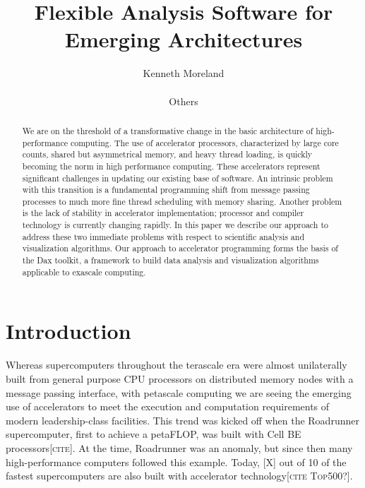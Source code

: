 \documentclass{sig-alternate}
\author{
  \alignauthor Kenneth Moreland \\
  \myaffaddr{Sandia National Laboratories} \\
  \myemail{kmorel@sandia.gov}
  \alignauthor Others
}
\title{Flexible Analysis Software for Emerging Architectures}
\newcommand{\fix}[1]{{\color{red}\textsc{[#1]}}}
\begin{document}
\sloppy

\maketitle

\begin{abstract}
  We are on the threshold of a transformative change in the basic
  architecture of high-performance computing.  The use of accelerator
  processors, characterized by large core counts, shared but asymmetrical
  memory, and heavy thread loading, is quickly becoming the norm in high
  performance computing.  These accelerators represent significant
  challenges in updating our existing base of software.  An intrinsic
  problem with this transition is a fundamental programming shift from
  message passing processes to much more fine thread scheduling with memory
  sharing.  Another problem is the lack of stability in accelerator
  implementation; processor and compiler technology is currently changing
  rapidly.  In this paper we describe our approach to address these two
  immediate problems with respect to scientific analysis and visualization
  algorithms.  Our approach to accelerator programming forms the basis of
  the Dax toolkit, a framework to build data analysis and visualization
  algorithms applicable to exascale computing.
\end{abstract}

\section{Introduction}
\label{sec:Introduction}

\noindent
Whereas supercomputers throughout the terascale era were almost
unilaterally built from general purpose CPU processors on distributed
memory nodes with a message passing interface, with petascale computing we
are seeing the emerging use of accelerators to meet the execution and
computation requirements of modern leadership-class facilities.  This trend
was kicked off when the Roadrunner supercomputer, first to achieve a
petaFLOP, was built with Cell BE processors\fix{cite}.  At the time,
Roadrunner was an anomaly, but since then many high-performance computers
followed this example.  Today, \fix{X} out of 10 of the fastest supercomputers
are also built with accelerator technology\fix{cite Top500?}.
\end{document}
